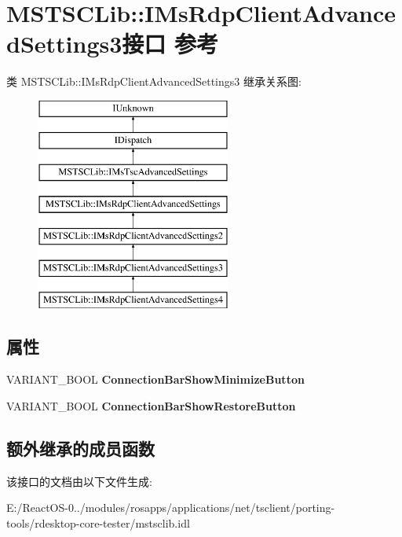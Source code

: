 \hypertarget{interface_m_s_t_s_c_lib_1_1_i_ms_rdp_client_advanced_settings3}{}\section{M\+S\+T\+S\+C\+Lib\+:\+:I\+Ms\+Rdp\+Client\+Advanced\+Settings3接口 参考}
\label{interface_m_s_t_s_c_lib_1_1_i_ms_rdp_client_advanced_settings3}
类 M\+S\+T\+S\+C\+Lib\+:\+:I\+Ms\+Rdp\+Client\+Advanced\+Settings3 继承关系图\+:\begin{figure}[H]
\begin{center}
\leavevmode
\includegraphics[height=7.000000cm]{interface_m_s_t_s_c_lib_1_1_i_ms_rdp_client_advanced_settings3}
\end{center}
\end{figure}
\subsection*{属性}
\begin{DoxyCompactItemize}
\item 
\mbox{\label{interface_m_s_t_s_c_lib_1_1_i_ms_rdp_client_advanced_settings3_a1d6eb6ccb353e3fc73575ebafeec0c1e}} 
V\+A\+R\+I\+A\+N\+T\+\_\+\+B\+O\+OL {\bfseries Connection\+Bar\+Show\+Minimize\+Button}
\item 
\mbox{\label{interface_m_s_t_s_c_lib_1_1_i_ms_rdp_client_advanced_settings3_a44bc872fa55f0d707cae657210635b45}} 
V\+A\+R\+I\+A\+N\+T\+\_\+\+B\+O\+OL {\bfseries Connection\+Bar\+Show\+Restore\+Button}
\end{DoxyCompactItemize}
\subsection*{额外继承的成员函数}


该接口的文档由以下文件生成\+:\begin{DoxyCompactItemize}
\item 
E\+:/\+React\+O\+S-\/0../modules/rosapps/applications/net/tsclient/porting-\/tools/rdesktop-\/core-\/tester/mstsclib.\+idl\end{DoxyCompactItemize}
